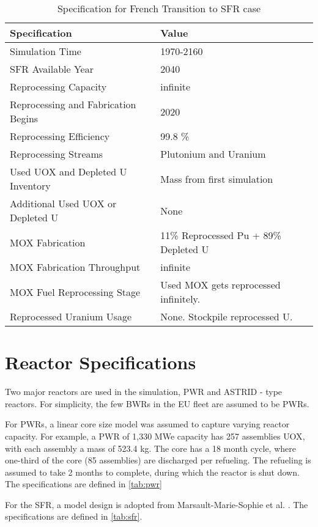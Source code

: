 \begin{table}[h]
	\centering
	\begin{tabularx}{\textwidth}{bb}
		\hline
		Specification & Value \\
		\hline
		Simulation Time & 1970-2160 \\
		\gls{SFR} Available Year & 2040 \\
		Reprocessing Capacity & infinite \\
		Reprocessing and Fabrication Begins & 2020 \\
		Reprocessing Efficiency & 99.8 \% \\
		Reprocessing Streams & Plutonium and Uranium \\
		\small{Used \gls{UOX} and Depleted U Inventory} & Mass from first simulation \\
		\small{Additional Used \gls{UOX} or Depleted U} & None  \\
		\gls{MOX} Fabrication &  \small{11\% Reprocessed Pu + 89\% Depleted U}  \\
		\gls{MOX} Fabrication Throughput & infinite \\
		\gls{MOX} Fuel Reprocessing Stage &  Used \gls{MOX} gets reprocessed infinitely. \\
		Reprocessed Uranium Usage &  None. Stockpile reprocessed U. \\
		\hline
	\end{tabularx}
	\caption {Specification for French Transition to \gls{SFR} case }
	\label{tab:sim_france}
\end{table}


\section{Reactor Specifications}
Two major reactors are used in the simulation, \gls{PWR} and ASTRID - type reactors.
For simplicity, the few \glspl{BWR} in the \gls{EU} fleet are assumed to be \glspl{PWR}.

For \glspl{PWR}, a linear core size model was assumed to capture
varying reactor capacity. For example, a PWR of
1,330 MWe capacity has 257 assemblies \gls{UOX}, with each
assembly a mass of 523.4 kg.
The core has a 18 month cycle, where one-third of the 
core (85 assemblies) are discharged per refueling. The refueling
is assumed to take 2 months to complete, during which the reactor
is shut down. The specifications are defined in \cref{tab:pwr}

For the \gls{SFR}, a model design is adopted from
Marsault-Marie-Sophie et al. \cite{marsaultmarie-sophie_pre-conceptual_2012}.
The specifications are defined in \cref{tab:sfr}.

